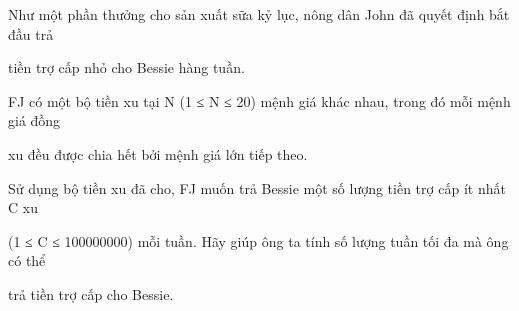 Như một phần thưởng cho sản xuất sữa kỷ lục, nông dân John đã quyết định bắt đầu trả  

   tiền trợ cấp nhỏ cho Bessie hàng tuần.  

   FJ có một bộ tiền xu tại N (1 ≤ N ≤ 20) mệnh giá khác nhau, trong đó mỗi mệnh giá đồng  

   xu đều được chia hết bởi mệnh giá lớn tiếp theo.  

   Sử dụng bộ tiền xu đã cho, FJ muốn trả Bessie một số lượng tiền trợ cấp ít nhất C xu  

   (1 ≤ C ≤ 100000000) mỗi tuần. Hãy giúp ông ta tính số lượng tuần tối đa mà ông có thể  

   trả tiền trợ cấp cho Bessie.  

\
